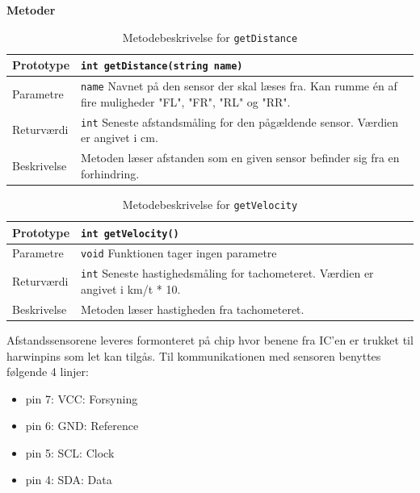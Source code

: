 \textbf{Metoder}

\begin{table}[h]
\begin{tabularx}{\textwidth}{| L{2.5 cm} | Z |} \hline
Prototype 	& \texttt{int getDistance(string name)} \\\hline
Parametre 	& \texttt{name} \newline Navnet på den sensor der skal læses fra. Kan rumme én af fire muligheder "FL", "FR", "RL" og "RR". \\\hline
Returværdi 	& \texttt{int} \newline Seneste afstandsmåling for den pågældende sensor. Værdien er angivet i cm. \\\hline
Beskrivelse & Metoden læser afstanden som en given sensor befinder sig fra en forhindring. \\\hline
\end{tabularx}
\caption{Metodebeskrivelse for \texttt{getDistance}}
\label{table:met_getdistance}
\end{table}

\begin{table}[h]
\begin{tabularx}{\textwidth}{| L{2.5 cm} | Z |} \hline
Prototype 	& \texttt{int getVelocity()} \\\hline
Parametre 	& \texttt{void} \newline Funktionen tager ingen parametre \\\hline
Returværdi 	& \texttt{int} \newline Seneste hastighedsmåling for tachometeret. Værdien er angivet i km/t * 10. \\\hline
Beskrivelse & Metoden læser hastigheden fra tachometeret. \\\hline
\end{tabularx}
\caption{Metodebeskrivelse for \texttt{getVelocity}}
\label{table:met_velocity}
\end{table}


\clearpage


Afstandssensorene leveres formonteret på chip hvor benene fra IC'en er trukket til harwinpins som let kan tilgås. Til kommunikationen med sensoren benyttes følgende 4 linjer: 

\begin{itemize}
	\item pin 7: VCC: Forsyning
	\item pin 6: GND: Reference
	\item pin 5: SCL: Clock
	\item pin 4: SDA: Data
\end{itemize}

